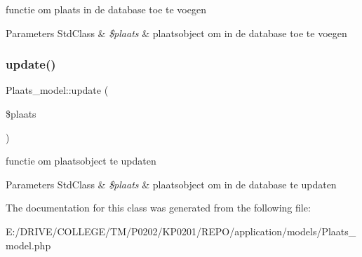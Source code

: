 functie om plaats in de database toe te voegen 
\begin{DoxyParams}[1]{Parameters}
Std\+Class & {\em \$plaats} & plaatsobject om in de database toe te voegen \\
\hline
\end{DoxyParams}
\mbox{\label{class_plaats__model_ac03a8dd14ad6cf143baca5f054ab94a1}} 
\subsubsection{\texorpdfstring{update()}{update()}}
{\footnotesize\ttfamily Plaats\+\_\+model\+::update (\begin{DoxyParamCaption}\item[{}]{\$plaats }\end{DoxyParamCaption})}

functie om plaatsobject te updaten 
\begin{DoxyParams}[1]{Parameters}
Std\+Class & {\em \$plaats} & plaatsobject om in de database te updaten \\
\hline
\end{DoxyParams}


The documentation for this class was generated from the following file\+:\begin{DoxyCompactItemize}
\item 
E\+:/\+D\+R\+I\+V\+E/\+C\+O\+L\+L\+E\+G\+E/\+T\+M/\+P0202/\+K\+P0201/\+R\+E\+P\+O/application/models/Plaats\+\_\+model.\+php\end{DoxyCompactItemize}
